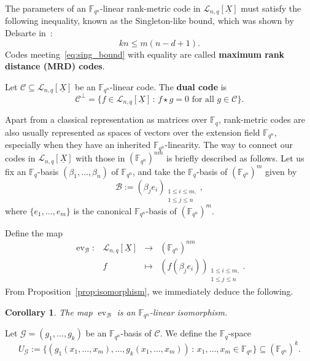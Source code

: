 \documentclass[11pt]{article}
\newtheorem{coro}[theo]{Corollary}
\theoremstyle{definition}
\numberwithin{equation}{section}
\DeclareMathOperator{\ev}{ev}
\begin{document}
The parameters of an ${\mathbb F}_{q^n}$-linear rank-metric code in $\mathcal{L}_{n,q}[\underline{X}]$ must satisfy the following  inequality, known as the Singleton-like bound, which was shown by Delsarte in~\cite{delsarte1978bilinear}:
\begin{equation}\label{eq:sing_bound}
     kn \leq m(n-d+1).
\end{equation}
Codes meeting~\eqref{eq:sing_bound} with equality are called \textbf{maximum rank distance (MRD) codes}.

Let $\mathcal{C}\subseteq \mathcal{L}_{n,q}[\underline{X}]$ be an ${\mathbb F}_{q^n}$-linear code. The \textbf{dual code} is $$\mathcal{C}^\perp=\{ f \in \mathcal{L}_{n,q}[\underline{X}] \, :\, f\star g = 0 \mbox{ for all } g \in \mathcal{C}\}.$$


Apart from a classical representation as matrices over $\mathbb{F}_q$, rank-metric codes are also usually represented as spaces of vectors over the extension field ${\mathbb F}_{q^n}$, especially when they have an inherited ${\mathbb F}_{q^n}$-linearity.  The way to connect our codes in $\mathcal{L}_{n,q}[\underline{X}]$ with those in $(\mathbb{F}_{q^n})^{nm}$ is briefly described as follows. Let us fix an $\mathbb{F}_q$-basis $(\beta_1,\ldots,\beta_n)$ of ${\mathbb F}_{q^n}$, and take the $\mathbb{F}_q$-basis of $({\mathbb F}_{q^n})^m$ given by 
\begin{equation}\label{eq:basis}\mathcal{B}:=(\beta_je_i)_{\substack{1\leq i \leq m,\\ 1 \leq j \leq n}},\end{equation}
where $\{e_1,\ldots,e_m\}$ is the canonical $\mathbb{F}_{q^n}$-basis of $(\mathbb{F}_{q^n})^m$.

Define the map
$$\begin{array}{rccl}\ev_{\mathcal{B}}:& \mathcal{L}_{n,q}[\underline{X}] & \longrightarrow & ({\mathbb F}_{q^n})^{nm} \\
&f & \longmapsto & (f(\beta_je_i))_{\substack{1\leq i \leq m,\\ 1 \leq j \leq n}}.\end{array}$$
From Proposition~\ref{prop:isomorphism}, we immediately deduce the following.
\begin{coro}
The map $\ev_{\mathcal{B}}$ is an ${\mathbb F}_{q^n}$-linear isomorphism.
\end{coro}
Let $\mathcal{G}=(g_1,\ldots, g_k)$ be an ${\mathbb F}_{q^n}$-basis of $\mathcal{C}$. We define the $\mathbb{F}_q$-space
$$ U_{\mathcal{G}}:=\{(g_1(x_1,\ldots,x_m), \ldots,g_k(x_1,\ldots,x_m) ) \, : \, x_1,\ldots,x_m \in {\mathbb F}_{q^n} \}\subseteq (\mathbb{F}_{q^n})^k. $$
\end{document}
